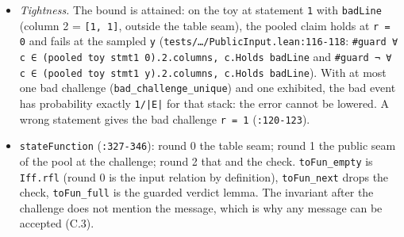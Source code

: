\begin{itemize}
\item \emph{Tightness.} The bound is attained: on the toy at statement \texttt{1} with \texttt{badLine} (column 2 = \texttt{[1,\allowbreak{} 1]}, outside the table seam), the pooled claim holds at \texttt{r = 0} and fails at the sampled \texttt{y} (\texttt{t\allowbreak{}e\allowbreak{}s\allowbreak{}t\allowbreak{}s\allowbreak{}/\allowbreak{}…\allowbreak{}/\allowbreak{}P\allowbreak{}u\allowbreak{}b\allowbreak{}l\allowbreak{}i\allowbreak{}c\allowbreak{}I\allowbreak{}n\allowbreak{}p\allowbreak{}u\allowbreak{}t\allowbreak{}.\allowbreak{}l\allowbreak{}e\allowbreak{}a\allowbreak{}n\allowbreak{}:\allowbreak{}1\allowbreak{}1\allowbreak{}6\allowbreak{}-{}\allowbreak{}1\allowbreak{}1\allowbreak{}8}: \texttt{\#\allowbreak{}g\allowbreak{}u\allowbreak{}a\allowbreak{}r\allowbreak{}d\allowbreak{} ∀\allowbreak{} c\allowbreak{} ∈\allowbreak{} (\allowbreak{}p\allowbreak{}o\allowbreak{}o\allowbreak{}l\allowbreak{}e\allowbreak{}d\allowbreak{} t\allowbreak{}o\allowbreak{}y\allowbreak{} s\allowbreak{}t\allowbreak{}m\allowbreak{}t\allowbreak{}1\allowbreak{} 0\allowbreak{})\allowbreak{}.\allowbreak{}2\allowbreak{}.\allowbreak{}c\allowbreak{}o\allowbreak{}l\allowbreak{}u\allowbreak{}m\allowbreak{}n\allowbreak{}s\allowbreak{},\allowbreak{} c\allowbreak{}.\allowbreak{}H\allowbreak{}o\allowbreak{}l\allowbreak{}d\allowbreak{}s\allowbreak{} b\allowbreak{}a\allowbreak{}d\allowbreak{}L\allowbreak{}i\allowbreak{}n\allowbreak{}e} and \texttt{\#\allowbreak{}g\allowbreak{}u\allowbreak{}a\allowbreak{}r\allowbreak{}d\allowbreak{} ¬\allowbreak{} ∀\allowbreak{} c\allowbreak{} ∈\allowbreak{} (\allowbreak{}p\allowbreak{}o\allowbreak{}o\allowbreak{}l\allowbreak{}e\allowbreak{}d\allowbreak{} t\allowbreak{}o\allowbreak{}y\allowbreak{} s\allowbreak{}t\allowbreak{}m\allowbreak{}t\allowbreak{}1\allowbreak{} y\allowbreak{})\allowbreak{}.\allowbreak{}2\allowbreak{}.\allowbreak{}c\allowbreak{}o\allowbreak{}l\allowbreak{}u\allowbreak{}m\allowbreak{}n\allowbreak{}s\allowbreak{},\allowbreak{} c\allowbreak{}.\allowbreak{}H\allowbreak{}o\allowbreak{}l\allowbreak{}d\allowbreak{}s\allowbreak{} b\allowbreak{}a\allowbreak{}d\allowbreak{}L\allowbreak{}i\allowbreak{}n\allowbreak{}e}). With at most one bad challenge (\texttt{bad\_\allowbreak{}challenge\_\allowbreak{}unique}) and one exhibited, the bad event has probability exactly \texttt{1/\allowbreak{}|E|} for that stack: the error cannot be lowered. A wrong statement gives the bad challenge \texttt{r = 1} (\texttt{:120-{}123}).
\item \texttt{stateFunction} (\texttt{:327-{}346}): round 0 the table seam; round 1 the public seam of the pool at the challenge; round 2 that and the check. \texttt{toFun\_\allowbreak{}empty} is \texttt{Iff.\allowbreak{}rfl} (round 0 is the input relation by definition), \texttt{toFun\_\allowbreak{}next} drops the check, \texttt{toFun\_\allowbreak{}full} is the guarded verdict lemma. The invariant after the challenge does not mention the message, which is why any message can be accepted (C.3).

\end{itemize}
